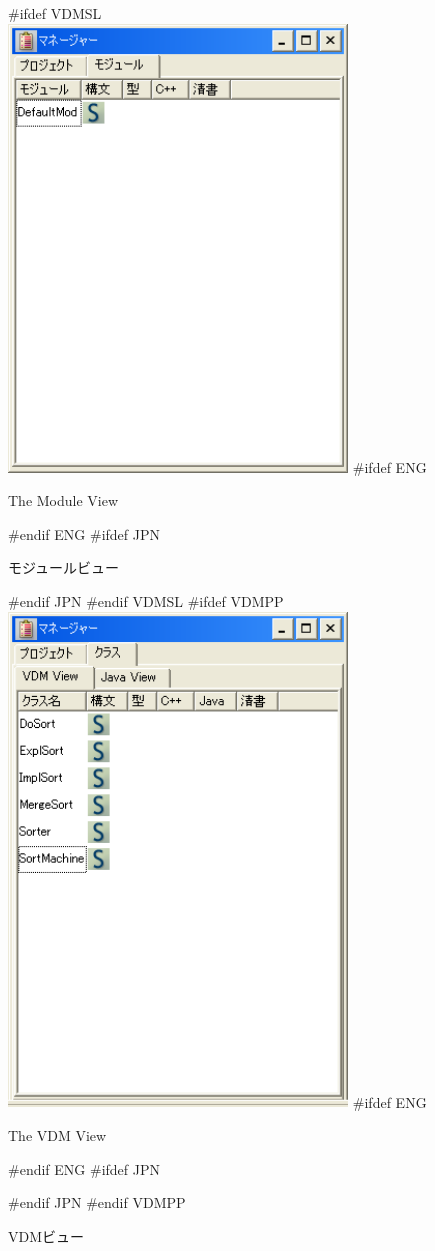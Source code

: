 \documentclass[\pformat,12pt]{article}
\begin{document}
\begin{figure}[tbh]
\begin{center}
#ifdef VDMSL
\includegraphics[width=9cm]{moduleView.png}
#ifdef ENG
\caption{The Module View}
#endif ENG
#ifdef JPN
\caption{モジュールビュー}
#endif JPN
#endif VDMSL
#ifdef VDMPP
\includegraphics[width=9cm]{vdmView.png}
#ifdef ENG
\caption{The VDM View}
#endif ENG
#ifdef JPN
\caption{VDMビュー}
#endif JPN
#endif VDMPP
\label{fig:vdmModView}
\end{center}
\end{figure}
\end{document}
